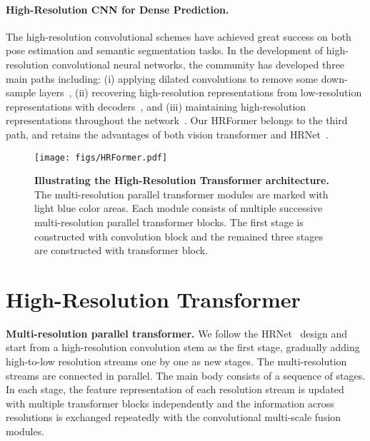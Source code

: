 \documentclass{article}
\begin{document}
\paragraph{High-Resolution CNN for Dense Prediction.}
The high-resolution convolutional schemes have achieved great success on
both pose estimation and semantic segmentation tasks.
In the development of high-resolution convolutional neural networks, the community has developed three main paths including: (i) applying dilated convolutions to remove some down-sample layers~\cite{chen2017deeplab,yu2015multi},
(ii) recovering high-resolution representations from low-resolution representations with  decoders~\cite{RonebergerFB15,BadrinarayananK17,newell2016stacked,NewellYD16},
and (iii) maintaining high-resolution representations throughout the network~\cite{WangSCJDZLMTWLX19,FourureEFMT017,SaxenaV16,ZhouHZ15,wang2020deep,zhang2020distribution,Huang2020CVPR}.
Our HRFormer belongs to the third path,
and retains the advantages of both
vision transformer and HRNet~\cite{WangSCJDZLMTWLX19}.


\begin{figure}[t]
  \small
  \centering
  \texttt{[image: figs/HRFormer.pdf]}
  \caption{\small \textbf{Illustrating the High-Resolution Transformer architecture.}
    The multi-resolution parallel transformer modules are marked with light blue color areas.
    Each module consists of multiple successive multi-resolution parallel transformer blocks. The first stage is constructed with convolution block and the remained three stages are constructed with transformer block.
  }
  \label{fig:HRFormer_arch}
\end{figure}



\section{High-Resolution Transformer}

\vspace{.1cm}
\noindent\textbf{Multi-resolution parallel transformer.}
We follow the HRNet~\cite{WangSCJDZLMTWLX19} design
and start from a high-resolution convolution stem as the first stage, gradually adding high-to-low resolution streams one by one as new stages. The multi-resolution streams are connected in parallel. The main body
consists of a sequence of stages.
In each stage, the feature representation of each resolution stream is updated
with multiple transformer blocks independently and the information
across resolutions is exchanged repeatedly with the convolutional
multi-scale fusion modules.
\end{document}
